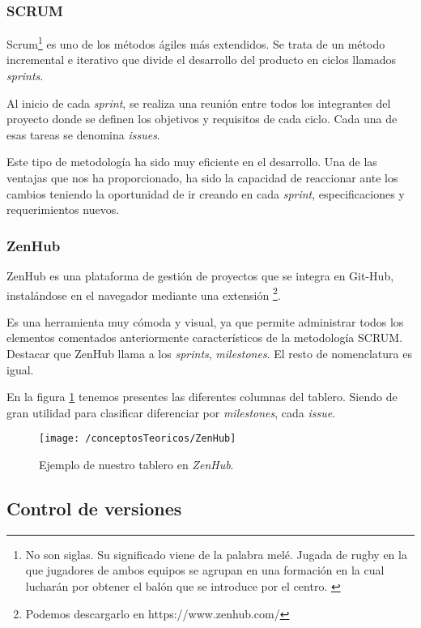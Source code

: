 \subsubsection{SCRUM}

Scrum\footnote{No son siglas. Su significado viene de la palabra melé. Jugada de rugby en la que 
	jugadores de ambos equipos se agrupan en una formación en la cual lucharán por obtener el balón que se introduce por el centro. \cite{web:scrum_origen}} es uno de los métodos ágiles más extendidos. Se trata de un método incremental e iterativo que divide el desarrollo del producto en ciclos llamados \textit{sprints}.

Al inicio de cada \textit{sprint}, se realiza una reunión entre todos los integrantes del proyecto donde se definen los objetivos y requisitos de cada ciclo. Cada una de esas tareas se denomina \textit{issues}.

Este tipo de metodología ha sido muy eficiente en el desarrollo. Una de las ventajas que nos ha proporcionado, ha sido la capacidad de reaccionar ante los cambios teniendo la oportunidad de ir creando en cada \textit{sprint}, especificaciones y requerimientos nuevos.

\subsubsection{ZenHub}

ZenHub es una plataforma de gestión de proyectos que se integra en Git-Hub, instalándose en el navegador mediante una extensión \footnote{Podemos descargarlo en https://www.zenhub.com/}.

Es una herramienta muy cómoda y visual, ya que permite administrar todos los elementos comentados anteriormente característicos de la metodología SCRUM. Destacar que ZenHub llama a los \textit{sprints}, \textit{milestones}. El resto de nomenclatura es igual.

En la figura \ref{fig:ZenHub} tenemos presentes las diferentes columnas del tablero. Siendo de gran utilidad para clasificar diferenciar por \textit{milestones}, cada \textit{issue}.

\begin{figure}[ht]
	\centering
	\texttt{[image: /conceptosTeoricos/ZenHub]}
	\caption{Ejemplo de nuestro tablero en \textit{ZenHub}.}
	\label{fig:ZenHub}
\end{figure}

\subsection{Control de versiones}

